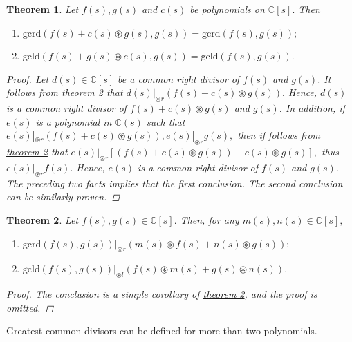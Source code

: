 \documentclass[12pt,a4paper,fleqn,twoside]{article}
\theoremstyle{plain}
\newtheorem{theorem}{Theorem}
\begin{document}
	\begin{theorem}
		Let $f(s),g(s)$ and $c(s)$ be polynomials on $\mathbb{C}[s].$ Then
		\begin{enumerate}[(1)]
			\normalfont
			\item $\mathrm{gcrd}(f(s)+c(s)\circledast g(s),g(s))=\mathrm{gcrd}(f(s),g(s));$
			\item $\mathrm{gcld}(f(s)+g(s)\circledast c(s),g(s))=\mathrm{gcld}(f(s),g(s)).$
		\end{enumerate}
		\begin{proof}
			Let $d(s)\in \mathbb{C}[s]$ be a common right divisor of $f(s)$ and $g(s)$. It follows from \hyperref[theorem 2]{theorem 2} that $d(s)|_{\circledast r}(f(s)+c(s)\circledast g(s)).$ Hence, $d(s)$ is a common right divisor of $f(s)+c(s)\circledast g(s)$ and $g(s)$. In addition, if $e(s)$ is a polynomial in $\mathbb{C}(s)$ such that $e(s)|_{\circledast r}(f(s)+c(s)\circledast g(s)),e(s)|_{\circledast r}g(s),$ then if follows from \hyperref[theorem 2]{theorem 2} that $e(s)|_{\circledast r}[(f(s)+c(s)\circledast g(s))-c(s)\circledast g(s)],$ thus $e(s)|_{\circledast r}f(s).$ Hence, $e(s)$ is a common right divisor of $f(s)$ and $g(s).$ The preceding two facts implies that the first conclusion. The second conclusion can be similarly proven. 
		\end{proof}
	\end{theorem}
	\begin{theorem}
		Let $f(s),g(s)\in \mathbb{C}[s].$ Then, for any $m(s),n(s)\in \mathbb{C}[s],$
		\begin{enumerate}[(1)]
			\normalfont
			\item $\mathrm{gcrd}(f(s),g(s))|_{\circledast r}(m(s)\circledast f(s)+n(s)\circledast g(s));$
			\item $\mathrm{gcld}(f(s),g(s))|_{\circledast l}(f(s)\circledast m(s)+g(s)\circledast n(s)).$
		\end{enumerate}
		\begin{proof}
			The conclusion is a simple corollary of \hyperref[theorem 2]{theorem 2}, and the proof is omitted.
		\end{proof}
	\end{theorem}
	Greatest common divisors can be defined for more than two polynomials.
\end{document}
